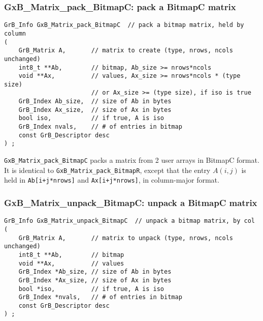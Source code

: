 \documentclass[12pt]{article}
\begin{document}
\newpage
\subsubsection{{\sf GxB\_Matrix\_pack\_BitmapC:} pack a BitmapC matrix}
\label{matrix_pack_bitmapc}

\begin{mdframed}[userdefinedwidth=6in]
{\footnotesize
\begin{verbatim}
GrB_Info GxB_Matrix_pack_BitmapC  // pack a bitmap matrix, held by column
(
    GrB_Matrix A,       // matrix to create (type, nrows, ncols unchanged)
    int8_t **Ab,        // bitmap, Ab_size >= nrows*ncols
    void **Ax,          // values, Ax_size >= nrows*ncols * (type size)
                        // or Ax_size >= (type size), if iso is true
    GrB_Index Ab_size,  // size of Ab in bytes
    GrB_Index Ax_size,  // size of Ax in bytes
    bool iso,           // if true, A is iso
    GrB_Index nvals,    // # of entries in bitmap
    const GrB_Descriptor desc
) ;
\end{verbatim}
} \end{mdframed}

\verb'GxB_Matrix_pack_BitmapC' packs a matrix from 2 user arrays in BitmapC
format.  It is identical to \verb'GxB_Matrix_pack_BitmapR', except that the
entry $A(i,j)$ is held in \verb'Ab[i+j*nrows]' and \verb'Ax[i+j*nrows]',
in column-major format.

\subsubsection{{\sf GxB\_Matrix\_unpack\_BitmapC:} unpack a BitmapC matrix}
\label{matrix_unpack_bitmapc}

\begin{mdframed}[userdefinedwidth=6in]
{\footnotesize
\begin{verbatim}
GrB_Info GxB_Matrix_unpack_BitmapC  // unpack a bitmap matrix, by col
(
    GrB_Matrix A,       // matrix to unpack (type, nrows, ncols unchanged)
    int8_t **Ab,        // bitmap
    void **Ax,          // values
    GrB_Index *Ab_size, // size of Ab in bytes
    GrB_Index *Ax_size, // size of Ax in bytes
    bool *iso,          // if true, A is iso
    GrB_Index *nvals,   // # of entries in bitmap
    const GrB_Descriptor desc
) ;
\end{verbatim}
} \end{mdframed}
\end{document}
